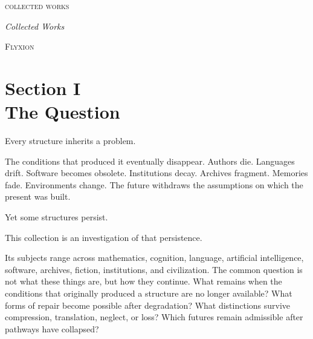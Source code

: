 \documentclass[12pt, openany]{book}
\begin{document}
\pagestyle{empty}
\vspace*{2.8in}
{\centering
\fontsize{11}{14}\selectfont\textsc{collected works}
\par}
\cleardoublepage

\thispagestyle{empty}
\vspace*{1.6in}
{\centering
\fontsize{22}{28}\selectfont\textit{Collected Works}

\vspace{0.55in}

\fontsize{14}{18}\selectfont\textsc{Flyxion}
\par}
\cleardoublepage

\pagestyle{fancy}
\tableofcontents
\cleardoublepage

\chapter[The Question]{Section I \\ The Question}

\noindent Every structure inherits a problem.

\medskip

\noindent The conditions that produced it eventually disappear.
Authors die. Languages drift. Software becomes obsolete. Institutions decay.
Archives fragment. Memories fade. Environments change. The future withdraws
the assumptions on which the present was built.

\medskip

\noindent Yet some structures persist.

\medskip

\noindent This collection is an investigation of that persistence.

\bigskip

\noindent Its subjects range across mathematics, cognition, language, artificial
intelligence, software, archives, fiction, institutions, and civilization.
The common question is not what these things are, but how they continue.
What remains when the conditions that originally produced a structure are no
longer available? What forms of repair become possible after degradation?
What distinctions survive compression, translation, neglect, or loss?
Which futures remain admissible after pathways have collapsed?
\end{document}
